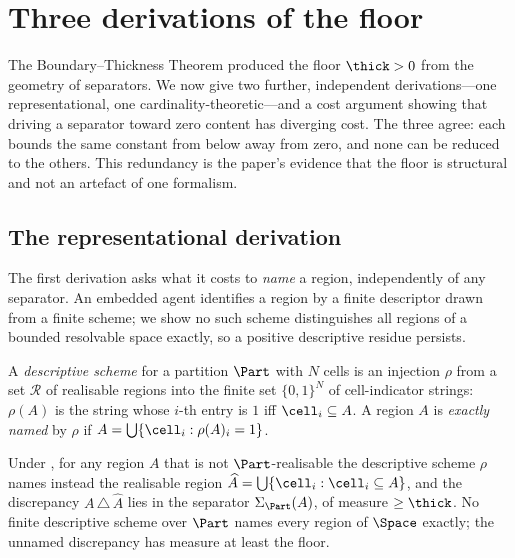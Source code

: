 
\section{Three derivations of the floor}
\label{sec:floor}

The Boundary--Thickness Theorem produced the floor $\thick>0$ from the geometry
of separators. We now give two further, independent derivations---one
representational, one cardinality-theoretic---and a cost argument showing that
driving a separator toward zero content has diverging cost. The three agree:
each bounds the same constant from below away from zero, and none can be reduced
to the others. This redundancy is the paper's evidence that the floor is
structural and not an artefact of one formalism.

\subsection{The representational derivation}

The first derivation asks what it costs to \emph{name} a region, independently of
any separator. An embedded agent identifies a region by a finite descriptor
drawn from a finite scheme; we show no such scheme distinguishes all regions of
a bounded resolvable space exactly, so a positive descriptive residue persists.

\begin{definition}
\label{def:scheme}
A \emph{descriptive scheme} for a partition $\Part$ with $N$ cells is an
injection $\rho$ from a set $\mathcal{R}$ of realisable regions into the finite
set $\{0,1\}^{N}$ of cell-indicator strings: $\rho(A)$ is the string whose
$i$-th entry is $1$ iff $\cell_i\subseteq A$. A region $A$ is
\emph{exactly named} by $\rho$ if $A=\bigcup\{\cell_i:\rho(A)_i=1\}$.
\end{definition}

\begin{proposition}
\label{prop:rep-residue}
Under , for any region $A$ that is not $\Part$-realisable the
descriptive scheme $\rho$ names instead the realisable region
$\widehat A=\bigcup\{\cell_i:\cell_i\subseteq A\}$, and the discrepancy
$A\,\triangle\,\widehat A$ lies in the separator $\Sigma_\Part(A)$, of measure
$\ge\thick$. No finite descriptive scheme over $\Part$ names every region of
$\Space$ exactly; the unnamed discrepancy has measure at least the floor.
\end{proposition}

